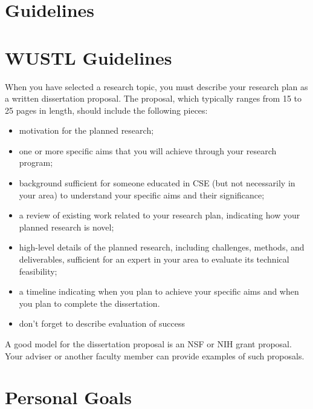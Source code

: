 \section{Guidelines}

\section{WUSTL Guidelines}

When you have selected a research topic, you must describe your
research plan as a written dissertation proposal. The proposal, which
typically ranges from 15 to 25 pages in length, should include the
following pieces:

\begin{itemize}

\item motivation for the planned research;

\item  one or more specific aims that you will achieve through your
research program;

\item  background sufficient for someone educated in CSE (but not
necessarily in your area) to understand your specific aims and their
significance;

\item a review of existing work related to your research plan,
indicating how your planned research is novel;

\item high-level details of the planned research, including
challenges, methods, and deliverables, sufficient for an expert in
your area to evaluate its technical feasibility;

\item a timeline indicating when you plan to achieve your specific
aims and when you plan to complete the dissertation.

\item don't forget to describe evaluation of success

\end{itemize}

A good model for the dissertation proposal is an NSF or NIH grant
proposal. Your adviser or another faculty member can provide examples
of such proposals.


\section{Personal Goals}

